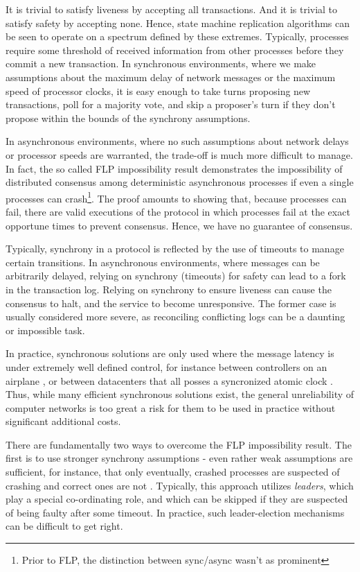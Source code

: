 It is trivial to satisfy liveness by accepting all transactions. And it is trivial to satisfy safety by accepting none.
Hence, state machine replication algorithms can be seen to operate on a spectrum defined by these extremes.
Typically, processes require some threshold of received information from other processes before they commit a new transaction.
In synchronous environments, 
where we make assumptions about the maximum delay of network messages or the maximum speed of processor clocks,
 it is easy enough to take turns proposing new transactions, poll for a majority vote, 
and skip a proposer's turn if they don't propose within the bounds of the synchrony assumptions.

In asynchronous environments, where no such assumptions about network delays or processor speeds are warranted,
the trade-off is much more difficult to manage.
In fact, the so called FLP impossibility result demonstrates the 
impossibility of distributed consensus among deterministic asynchronous processes 
if even a single processes can crash\footnote{Prior to FLP, the distinction between sync/async wasn't as prominent}\cite{flp}.
The proof amounts to showing that, because processes can fail, 
there are valid executions of the protocol in which processes fail at the exact opportune times to prevent consensus.
Hence, we have no guarantee of consensus.

Typically, synchrony in a protocol is reflected by the use of timeouts to manage certain transitions.
In asynchronous environments, where messages can be arbitrarily delayed, relying on synchrony (timeouts) for safety
can lead to a fork in the transaction log.
Relying on synchrony to ensure liveness can cause the consensus to halt, and the service to become unresponsive.
The former case is usually considered more severe, as reconciling conflicting logs can be a daunting or impossible task. 

In practice, synchronous solutions are only used where the message latency is under 
extremely well defined control, for instance between controllers on an airplane \cite{},
or between datacenters that all posses a syncronized atomic clock \cite{spanner}.
Thus, while many efficient synchronous solutions exist,
the general unreliability of computer networks is too great a risk for them to be used in practice
without significant additional costs.

There are fundamentally two ways to overcome the FLP impossibility result.
The first is to use stronger synchrony assumptions - 
even rather weak assumptions are sufficient, 
for instance, that only eventually, 
crashed processes are suspected of crashing and correct ones are not \cite{chandra1996unreliable}.
Typically, this approach utilizes \emph{leaders}, 
which play a special co-ordinating role, 
and which can be skipped if they are suspected of being faulty after some timeout.
In practice, such leader-election mechanisms can be difficult to get right.

